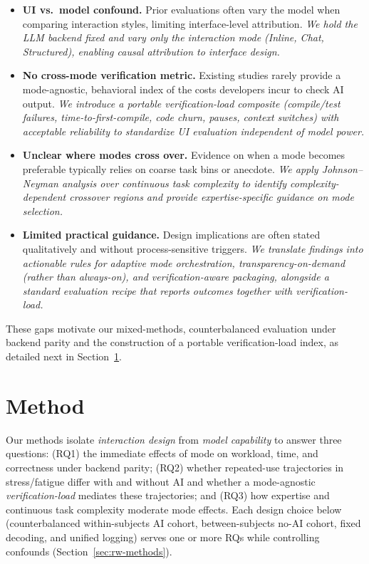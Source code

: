 \documentclass[sigconf]{acmart}
\begin{document}
\begin{itemize}[leftmargin=1.25em, itemsep=0.25em]
  \item \textbf{UI vs.\ model confound.} Prior evaluations often vary the model when comparing interaction styles, limiting interface-level attribution. \emph{We hold the LLM backend fixed and vary only the interaction mode (Inline, Chat, Structured), enabling causal attribution to interface design.}

  \item \textbf{No cross-mode verification metric.} Existing studies rarely provide a mode-agnostic, behavioral index of the costs developers incur to check AI output. \emph{We introduce a portable verification-load composite (compile/test failures, time-to-first-compile, code churn, pauses, context switches) with acceptable reliability to standardize UI evaluation independent of model power.}

  \item \textbf{Unclear where modes cross over.} Evidence on when a mode becomes preferable typically relies on coarse task bins or anecdote. \emph{We apply Johnson--Neyman analysis over continuous task complexity to identify complexity-dependent crossover regions and provide expertise-specific guidance on mode selection.}

  \item \textbf{Limited practical guidance.} Design implications are often stated qualitatively and without process-sensitive triggers. \emph{We translate findings into actionable rules for adaptive mode orchestration, transparency-on-demand (rather than always-on), and verification-aware packaging, alongside a standard evaluation recipe that reports outcomes together with verification-load.}
\end{itemize}

These gaps motivate our mixed-methods, counterbalanced evaluation under backend parity and the construction of a portable verification-load index, as detailed next in Section~\ref{sec:method}.


\section{Method}
\label{sec:method}
Our methods isolate \emph{interaction design} from \emph{model capability} to answer three questions: (RQ1) the immediate effects of mode on workload, time, and correctness under backend parity; (RQ2) whether repeated-use trajectories in stress/fatigue differ with and without AI and whether a mode-agnostic \emph{verification-load} mediates these trajectories; and (RQ3) how expertise and continuous task complexity moderate mode effects. Each design choice below (counterbalanced within-subjects AI cohort, between-subjects no-AI cohort, fixed decoding, and unified logging) serves one or more RQs while controlling confounds (Section~\ref{sec:rw-methods}).
\end{document}
